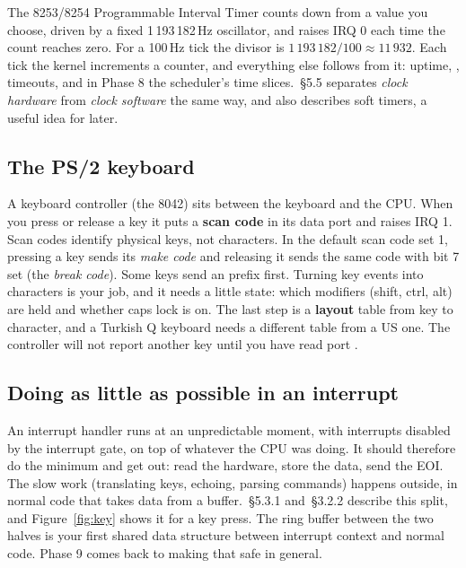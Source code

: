 \documentclass[11pt,a4paper]{article}
\begin{document}
The 8253/8254 Programmable Interval Timer counts down from a value you choose, driven by a fixed
1\,193\,182\,Hz oscillator, and raises IRQ 0 each time the count reaches zero. For a 100\,Hz tick the divisor is
$1\,193\,182 / 100 \approx 11\,932$. Each tick the kernel increments a counter, and everything else follows from it:
uptime, , timeouts, and in Phase 8 the scheduler's time slices. \MOS\,\S5.5 separates \emph{clock
hardware} from \emph{clock software} the same way, and also describes soft timers, a useful idea for later.

\subsection{The PS/2 keyboard}

A keyboard controller (the 8042) sits between the keyboard and the CPU. When you press or release a key it puts a
\textbf{scan code} in its data port  and raises IRQ 1. Scan codes identify physical keys, not characters.
In the default scan code set 1, pressing a key sends its \emph{make code} and releasing it sends the same code with
bit 7 set (the \emph{break code}). Some keys send an  prefix first. Turning key events into characters is
your job, and it needs a little state: which modifiers (shift, ctrl, alt) are held and whether caps lock is on. The
last step is a \textbf{layout} table from key to character, and a Turkish Q keyboard needs a different table from a US
one. The controller will not report another key until you have read port .

\subsection{Doing as little as possible in an interrupt}

An interrupt handler runs at an unpredictable moment, with interrupts disabled by the interrupt gate, on top of
whatever the CPU was doing. It should therefore do the minimum and get out: read the hardware, store the data, send
the EOI. The slow work (translating keys, echoing, parsing commands) happens outside, in normal code that takes data
from a buffer. \MOS\,\S5.3.1 and \OSDI\,\S3.2.2 describe this split, and Figure~\ref{fig:key} shows it for a key
press. The ring buffer between the two halves is your first shared data structure between interrupt context and
normal code. Phase 9 comes back to making that safe in general.
\end{document}
